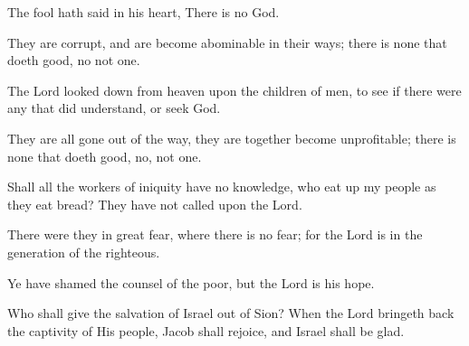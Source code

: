 The fool hath said in his heart, There is no God.

They are corrupt, and are become abominable in their ways; there is none that doeth good, no not one.

The Lord looked down from heaven upon the children of men, to see if there were any that did understand, or seek God.

They are all gone out of the way, they are together become unprofitable; there is none that doeth good, no, not one.

Shall all the workers of iniquity have no knowledge, who eat up my people as they eat bread? They have not called upon the Lord.

There were they in great fear, where there is no fear; for the Lord is in the generation of the righteous.

Ye have shamed the counsel of the poor, but the Lord is his hope.

Who shall give the salvation of Israel out of Sion? When the Lord bringeth back the captivity of His people, Jacob shall rejoice, and Israel shall be glad.
